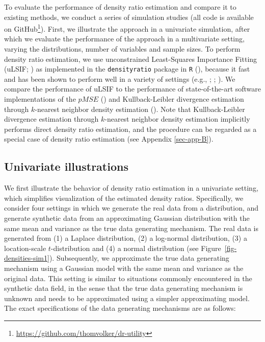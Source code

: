 \documentclass[
]{article}
\begin{document}
To evaluate the performance of density ratio estimation and compare it
to existing methods, we conduct a series of simulation studies (all code
is available on GitHub\footnote{\url{https://github.com/thomvolker/dr-utility}}).
First, we illustrate the approach in a univariate simulation, after
which we evaluate the performance of the approach in a multivariate
setting, varying the distributions, number of variables and sample
sizes. To perform density ratio estimation, we use unconstrained
Least-Squares Importance Fitting (uLSIF;
)
as implemented in the \texttt{densityratio} package in \texttt{R}
(), because it fast and has been
shown to perform well in a variety of settings (e.g.,
;
;
). We
compare the performance of uLSIF to the performance of state-of-the-art
software implementations of the \(pMSE\) () and Kullback-Leibler divergence estimation
through \(k\)-nearest neighbor density estimation
(). Note that Kullback-Leibler
divergence estimation through \(k\)-nearest neighbor density estimation
implicitly performs direct density ratio estimation, and the procedure
can be regarded as a special case of density ratio estimation (see
Appendix \ref{sec-app-B}).

\subsection{Univariate illustrations}\label{sec-univ-sims}

We first illustrate the behavior of density ratio estimation in a
univariate setting, which simplifies visualization of the estimated
density ratios. Specifically, we consider four settings in which we
generate the real data from a distribution, and generate synthetic data
from an approximating Gaussian distribution with the same mean and
variance as the true data generating mechanism. The real data is
generated from (1) a Laplace distribution, (2) a log-normal
distribution, (3) a location-scale \(t\)-distribution and (4) a normal
distribution (see Figure~\ref{fig-densities-sim1}). Subsequently, we
approximate the true data generating mechanism using a Gaussian model
with the same mean and variance as the original data. This setting is
similar to situations commonly encountered in the synthetic data field,
in the sense that the true data generating mechanism is unknown and
needs to be approximated using a simpler approximating model. The exact
specifications of the data generating mechanisms are as follows:
\end{document}
